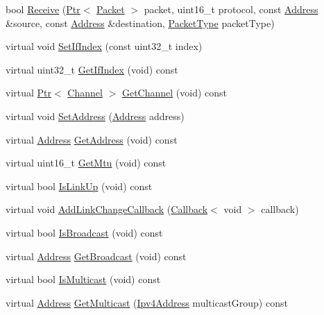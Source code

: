 \begin{DoxyCompactItemize}
bool \hyperlink{classns3_1_1VirtualNetDevice_a4e13d506dae86955be99116c23034e28}{Receive} (\hyperlink{classns3_1_1Ptr}{Ptr}$<$ \hyperlink{classns3_1_1Packet}{Packet} $>$ packet, uint16\+\_\+t protocol, const \hyperlink{classns3_1_1Address}{Address} \&source, const \hyperlink{classns3_1_1Address}{Address} \&destination, \hyperlink{classns3_1_1NetDevice_ace65153f09144f55a0d3e702fc29d6b2}{Packet\+Type} packet\+Type)
\item 
virtual void \hyperlink{classns3_1_1VirtualNetDevice_a625c4b50d530dc677b2dbee19f06de56}{Set\+If\+Index} (const uint32\+\_\+t index)
\item 
virtual uint32\+\_\+t \hyperlink{classns3_1_1VirtualNetDevice_ac7297332493d46b81cd291e71ba54fca}{Get\+If\+Index} (void) const 
\item 
virtual \hyperlink{classns3_1_1Ptr}{Ptr}$<$ \hyperlink{classns3_1_1Channel}{Channel} $>$ \hyperlink{classns3_1_1VirtualNetDevice_ad06bf273cbaf976574d6e540db73bc48}{Get\+Channel} (void) const 
\item 
virtual void \hyperlink{classns3_1_1VirtualNetDevice_a560887abe97f9327f2973d748aa382e9}{Set\+Address} (\hyperlink{classns3_1_1Address}{Address} address)
\item 
virtual \hyperlink{classns3_1_1Address}{Address} \hyperlink{classns3_1_1VirtualNetDevice_a8c8219e4244461ea705b3829a599931c}{Get\+Address} (void) const 
\item 
virtual uint16\+\_\+t \hyperlink{classns3_1_1VirtualNetDevice_a9f0f1def1c49995cce47321bd78f1063}{Get\+Mtu} (void) const 
\item 
virtual bool \hyperlink{classns3_1_1VirtualNetDevice_a72627c9d0c272f15338c1d7611a07498}{Is\+Link\+Up} (void) const 
\item 
virtual void \hyperlink{classns3_1_1VirtualNetDevice_ad93701226c958be8c1d7233d8beb0010}{Add\+Link\+Change\+Callback} (\hyperlink{classns3_1_1Callback}{Callback}$<$ void $>$ callback)
\item 
virtual bool \hyperlink{classns3_1_1VirtualNetDevice_a3fd0309cbcf76ef18412b1affaebeddf}{Is\+Broadcast} (void) const 
\item 
virtual \hyperlink{classns3_1_1Address}{Address} \hyperlink{classns3_1_1VirtualNetDevice_a178f087d04d32b6b8d893f5a1f60aabe}{Get\+Broadcast} (void) const 
\item 
virtual bool \hyperlink{classns3_1_1VirtualNetDevice_a6a431d51ea635ffbe87e1bb9745cd781}{Is\+Multicast} (void) const 
\item 
virtual \hyperlink{classns3_1_1Address}{Address} \hyperlink{classns3_1_1VirtualNetDevice_abe6b930113d459edbcdaef8e2337260f}{Get\+Multicast} (\hyperlink{classns3_1_1Ipv4Address}{Ipv4\+Address} multicast\+Group) const 

\end{DoxyCompactItemize}
